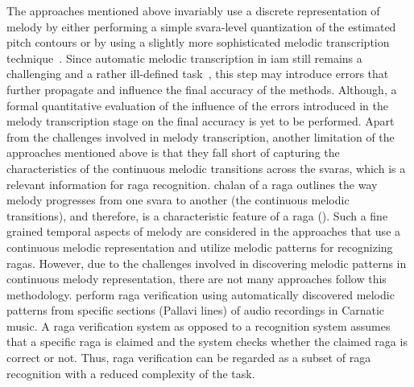 The approaches mentioned above invariably use a discrete representation of melody by either performing a simple \gls{svara}-level quantization of the estimated pitch contours or by using a slightly more sophisticated melodic transcription technique~\citep{pandey2003tansen}. Since automatic melodic transcription in \gls{iam} still remains a challenging and a rather ill-defined task~\citep{widdess1994involving}, this step may introduce errors that further propagate and influence the final accuracy of the methods. Although, a formal quantitative evaluation of the influence of the errors introduced in the melody transcription stage on the final accuracy is yet to be performed. Apart from the challenges involved in melody transcription, another limitation of the approaches mentioned above is that they fall short of capturing the characteristics  of  the continuous melodic transitions across the \glspl{svara}, which is a relevant information for \gls{raga} recognition. \Gls{chalan} of a \gls{raga} outlines the way melody progresses from one \gls{svara} to another (the continuous melodic transitions), and therefore, is a characteristic feature of a \gls{raga} (). Such a fine grained temporal aspects of melody are considered in the approaches that use a continuous melodic representation and utilize melodic patterns for recognizing \glspl{raga}. However, due to the challenges involved in discovering melodic patterns in continuous melody representation, there are not many approaches follow this methodology. \cite{shrey_ISMIR_2015} perform \gls{raga} verification using automatically discovered melodic patterns from specific sections (Pallavi lines) of audio recordings in Carnatic music. A \gls{raga} verification system as opposed to a recognition system assumes that a specific \gls{raga} is claimed and the system checks whether the claimed \gls{raga} is correct or not. Thus, \gls{raga} verification can be regarded as a subset of \gls{raga} recognition with a reduced complexity of the task. 

